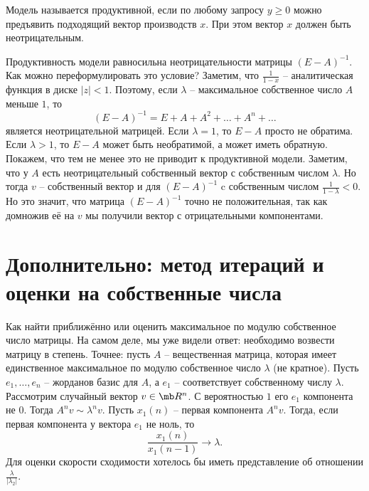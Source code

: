 Модель называется продуктивной, если по любому запросу $y\geq 0$ можно предъявить подходящий вектор  производств $x$. При этом вектор $x$ должен быть неотрицательным. 

Продуктивность модели равносильна неотрицательности матрицы $(E-A)^{-1}$. Как можно переформулировать это условие? Заметим, что $\frac{1}{1-x}$ -- аналитическая функция в диске $|z|<1$. Поэтому, если $\lambda$ -- максимальное собственное число $A$ меньше $1$, то $$(E-A)^{-1}=E+A+A^2+\dots +A^n+\dots$$
является неотрицательной матрицей. Если $\lambda=1$, то $E-A$ просто не обратима. Если $\lambda>1$, то $E-A$ может быть необратимой, а может иметь обратную. Покажем, что тем не менее это не приводит к продуктивной модели. Заметим, что у $A$ есть неотрицательный собственный вектор с собственным числом $\lambda$. Но тогда $v$ -- собственный вектор и для $(E-A)^{-1}$ c собственным числом $\frac{1}{1-\lambda}<0$. Но это значит, что матрица $(E-A)^{-1}$ точно не положительная, так как домножив её на $v$ мы получили вектор с отрицательными компонентами.

\section{Дополнительно: метод итераций и оценки на собственные числа}

Как найти приближённо или оценить максимальное по модулю собственное число матрицы. На самом деле, мы уже видели ответ: необходимо возвести матрицу в степень. Точнее: пусть $A$ -- вещественная матрица, которая имеет единственное максимальное по модулю собственное число $\lambda$ (не кратное). Пусть $e_1,\dots,e_n$ -- жорданов базис для $A$, а $e_1$ -- соответствует собственному числу $\lambda$. Рассмотрим случайный вектор $v\in \mb R^n$. С вероятностью $1$ его $e_1$ компонента не $0$. Тогда $A^nv \sim \lambda^n v$. Пусть $x_1(n)$ -- первая компонента $A^nv$. Тогда, если первая компонента у вектора $e_1$ не ноль, то $$\frac{x_1(n)}{x_1(n-1)} \to \lambda.$$
Для оценки скорости сходимости хотелось бы иметь представление об отношении  $\frac{\lambda}{|\lambda_2|}$.

\begin{comment}

Похожая технология применяется, когда необходимо приближённо найти решение системы $x=Ax+b$, где $A$ -- квадратная матрица. Точнее, пусть собственные числа $A$ по модулю меньше $1$. Возьмём случайный вектор $x_0$ и построим последовательность $$x_i=Ax_{i-1}+b.$$
Покажем, что при указанных условия, эта последовательность стремится к решению системы. Прежде всего заметим, что матрица $E-A$ обратима, и, следовательно, система имеет единственное решение. Пусть это решение --- $x'$. Обозначим $h_i=x_i-x'$. Для $h_i$ получается соотношение:
$$x'+h_i=Ax'+Ah_{i-1}+b.$$
Откуда получаем, что $h_i=Ah_{i-1}$. Но тогда $h_i$ стремятся к нулю. Значит $x_i\to x'$.

\end{comment}

